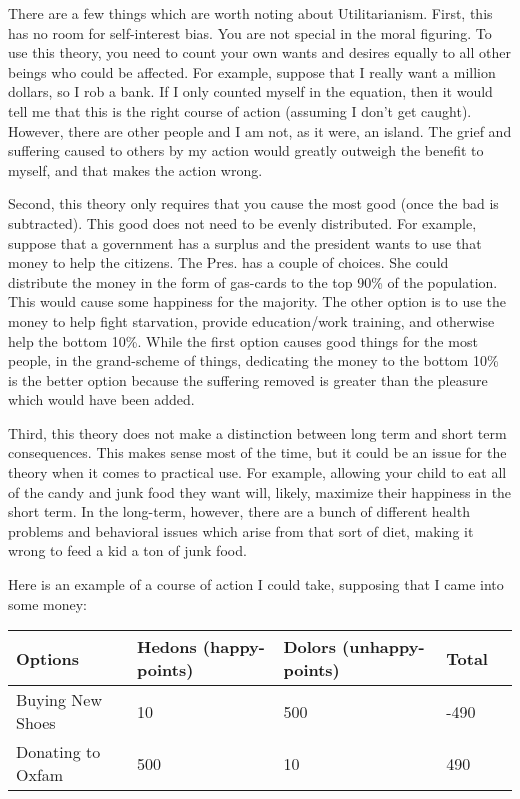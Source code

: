 There are a few things which are worth noting about Utilitarianism. First, this has no room for self-interest bias. You are not special in the moral figuring. To use this theory, you need to count your own wants and desires equally to all other beings who could be affected. For example, suppose that I really want a million dollars, so I rob a bank. If I only counted myself in the equation, then it would tell me that this is the right course of action (assuming I don't get caught). However, there are other people and I am not, as it were, an island. The grief and suffering caused to others by my action would greatly outweigh the benefit to myself, and that makes the action wrong.

Second, this theory only requires that you cause the most good (once the bad is subtracted). This good does not need to be evenly distributed. For example, suppose that a government has a surplus and the president wants to use that money to help the citizens. The Pres. has a couple of choices. She could distribute the money in the form of gas-cards to the top 90\% of the population. This would cause some happiness for the majority. The other option is to use the money to help fight starvation, provide education/work training, and otherwise help the bottom 10\%. While the first option causes good things for the most people, in the grand-scheme of things, dedicating the money to the bottom 10\% is the better option because the suffering removed is greater than the pleasure which would have been added. 

Third, this theory does not make a distinction between long term and short term consequences. This makes sense most of the time, but it could be an issue for the theory when it comes to practical use. For example, allowing your child to eat all of the candy and junk food they want will, likely, maximize their happiness in the short term. In the long-term, however, there are a bunch of different health problems and behavioral issues which arise from that sort of diet, making it wrong to feed a kid a ton of junk food.

Here is an example of a course of action I could take, supposing that I came into some money:

\noindent	
\begin{tabular}{p{1in}|p{1.5in}|p{1.5in}|p{1in}|p{1in}}
Options&Hedons (happy-points)&Dolors (unhappy-points)&Total\\\hline

Buying New Shoes&10&500&-490\\

Donating to Oxfam&500&10&490
\end{tabular}


